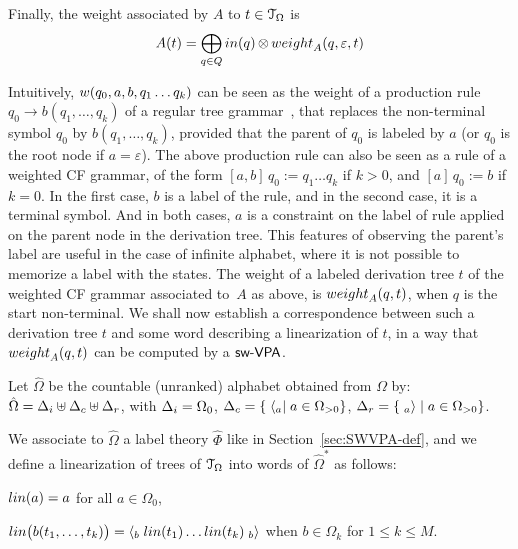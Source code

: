 \medskip\noindent
Finally, the weight associated by $A$ to  $t \in \mathcal{T}_\Omega$ is
\begin{equation}
A(t)  =
\displaystyle\bigoplus_{q \in Q} \mathsf{in}(q) \mathop{\otimes} \weight_A(q, \varepsilon, t)
\label{eq:weightTA}
\end{equation}

\noindent
Intuitively, $\wei(q_0, a, b, q_1 \ldots q_k)$ can be seen as
the weight of a production rule $q_0 \to b(q_1, \ldots, q_k)$
of a regular tree grammar~\cite{tata},
that replaces the non-terminal symbol $q_0$ by $b(q_1, \ldots, q_k)$,
provided that the parent of $q_0$ is labeled by $a$
(or $q_0$ is the root node if $a = \varepsilon$).
%
The above production rule can also be seen as
a rule of a weighted CF grammar, of the form
$[a, b]\, q_0 := q_1 \ldots q_k$ if $k > 0$,
and $[a]\, q_0 := b$ if $k = 0$.
In the first case, $b$ is a label of the rule,
and in the second case, it is a terminal symbol.
And in both cases, $a$ is a constraint on the label of rule applied
on the parent node in the derivation tree.
This features of observing the parent's label
are useful in the case of infinite alphabet,
where it is not possible to memorize a label with the states.
%
\noindent The weight of a labeled derivation tree $t$
of the weighted CF grammar associated to~$A$ as above,
is $\weight_A(q, t)$,
when $q$ is the start non-terminal.
%
We shall now establish a correspondence between such a derivation tree $t$
and some word describing a linearization of $t$,
in a way that $\weight_A(q, t)$ can be computed by a $\textsf{sw-VPA}$.

Let $\hat\Omega$ be the countable (unranked) alphabet obtained
from $\Omega$ by:
$\hat\Omega = \Deltai \uplus \Deltac \uplus \Deltar$, with
$\Deltai = \Omega_0$,
$\Deltac = \{ \; \call{a} \mid a \in \Omega_{>0} \}$,
$\Deltar = \{ \; \return{a} \mid a \in \Omega_{>0} \}$.

\noindent
We associate to $\hat\Omega$
a label theory $\hat{\Phi}$
like in Section~\ref{sec:SWVPA-def},
%
\noindent
and we define a linearization of trees of $\mathcal{T}_\Omega$ into
words of ${\hat\Omega}^*$ as follows:
\begin{description}
\item $\lin(a) = a$ for all $a \in \Omega_0$,
\item $\lin\bigl( b(t_1, \ldots, t_k)\bigr) =
       \call{b} \; \lin(t_1) \ldots \lin(t_k) \; \return{b}$
       when $b \in \Omega_k$ for $1 \leq k \leq M$.
\end{description}

